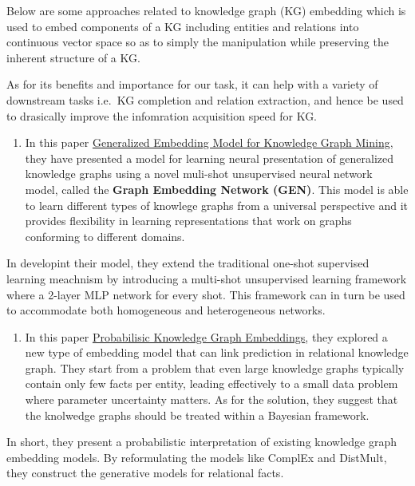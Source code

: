\documentclass[]{book}
\providecommand{\tightlist}{%
  \setlength{\itemsep}{0pt}\setlength{\parskip}{0pt}}
\theoremstyle{definition}
\theoremstyle{definition}
\theoremstyle{definition}
\theoremstyle{remark}
\begin{document}
Below are some approaches related to knowledge graph (KG) embedding
which is used to embed components of a KG including entities and
relations into continuous vector space so as to simply the manipulation
while preserving the inherent structure of a KG.

As for its benefits and importance for our task, it can help with a
variety of downstream tasks i.e.~KG completion and relation extraction,
and hence be used to drasically improve the infomration acquisition
speed for KG.

\begin{enumerate}
\def\labelenumi{\arabic{enumi}.}
\setcounter{enumi}{1}
\tightlist
\item
  In this paper
  \href{http://www.mlgworkshop.org/2018/papers/MLG2018_paper_5.pdf}{Generalized
  Embedding Model for Knowledge Graph Mining}, they have presented a
  model for learning neural presentation of generalized knowledge graphs
  using a novel muli-shot unsupervised neural network model, called the
  \textbf{Graph Embedding Network (GEN)}. This model is able to learn
  different types of knowlege graphs from a universal perspective and it
  provides flexibility in learning representations that work on graphs
  conforming to different domains.
\end{enumerate}

In developint their model, they extend the traditional one-shot
supervised learning meachnism by introducing a multi-shot unsupervised
learning framework where a 2-layer MLP network for every shot. This
framework can in turn be used to accommodate both homogeneous and
heterogeneous networks.

\begin{enumerate}
\def\labelenumi{\arabic{enumi}.}
\setcounter{enumi}{2}
\tightlist
\item
  In this paper
  \href{https://openreview.net/pdf?id=rJ4qXnCqFX}{Probabilisic Knowledge
  Graph Embeddings}, they explored a new type of embedding model that
  can link prediction in relational knowledge graph. They start from a
  problem that even large knowledge graphs typically contain only few
  facts per entity, leading effectively to a small data problem where
  parameter uncertainty matters. As for the solution, they suggest that
  the knolwedge graphs should be treated within a Bayesian framework.
\end{enumerate}

In short, they present a probabilistic interpretation of existing
knowledge graph embedding models. By reformulating the models like
ComplEx and DistMult, they construct the generative models for
relational facts.
\end{document}
